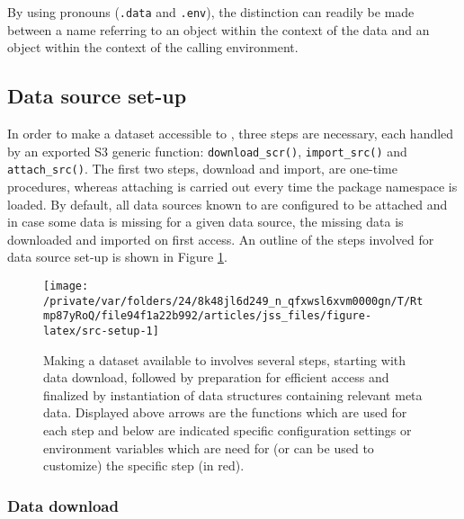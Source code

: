 \documentclass[
  notitle]{jss}
\begin{document}
By using  pronouns (\texttt{.data} and \texttt{.env}), the
distinction can readily be made between a name referring to an object
within the context of the data and an object within the context of the
calling environment.

\hypertarget{data-source-set-up}{%
\subsection{Data source set-up}\label{data-source-set-up}}

In order to make a dataset accessible to , three steps are
necessary, each handled by an exported S3 generic function:
\texttt{download\_scr()}, \texttt{import\_src()} and
\texttt{attach\_src()}. The first two steps, download and import, are
one-time procedures, whereas attaching is carried out every time the
package namespace is loaded. By default, all data sources known to
 are configured to be attached and in case some data is
missing for a given data source, the missing data is downloaded and
imported on first access. An outline of the steps involved for data
source set-up is shown in Figure \ref{fig:src-setup}.

\begin{CodeChunk}
\begin{figure}

{\centering \texttt{[image: /private/var/folders/24/8k48jl6d249\_n\_qfxwsl6xvm0000gn/T/Rtmp87yRoQ/file94f1a22b992/articles/jss\_files/figure-latex/src-setup-1]} 

}

\caption[Making a dataset available to  involves several steps, starting with data download, followed by preparation for efficient access and finalized by instantiation of data structures containing relevant meta data]{Making a dataset available to  involves several steps, starting with data download, followed by preparation for efficient access and finalized by instantiation of data structures containing relevant meta data. Displayed above arrows are the functions which are used for each step and below are indicated specific configuration settings or environment variables which are need for (or can be used to customize) the specific step (in red).}\label{fig:src-setup}
\end{figure}
\end{CodeChunk}

\hypertarget{data-download}{%
\subsubsection{Data download}\label{data-download}}
\end{document}
